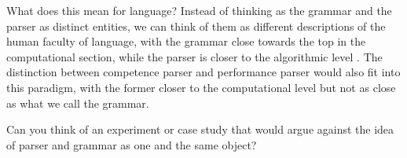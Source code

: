 What does this mean for language?
Instead of thinking as the grammar and the parser as distinct entities, we can think of them as different descriptions of the human faculty of language, with the grammar close towards the top in the computational section, while the parser is closer to the algorithmic level \citep[cf.][]{NeelemanKoot10}.
The distinction between competence parser and performance parser would also fit into this paradigm, with the former closer to the computational level but not as close as what we call the grammar.

\begin{exercise}
    Can you think of an experiment or case study that would argue against the idea of parser and grammar as one and the same object?
\end{exercise}






